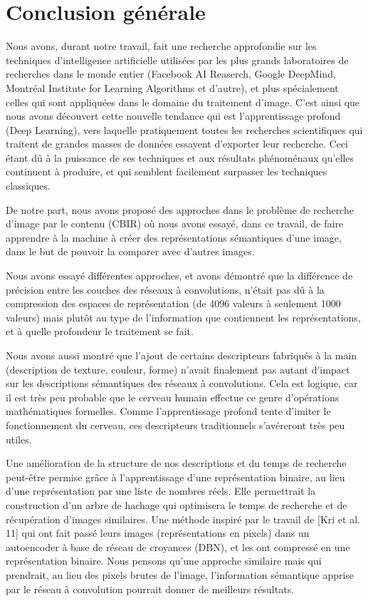 
\chapter*{Conclusion générale} %

Nous avons, durant notre travail, fait une recherche approfondie sur les techniques d'intelligence artificielle utilisées par les plus grands laboratoires de recherches dans le monde entier (Facebook AI Reaserch, Google DeepMind, Montréal Institute for Learning Algorithms et d'autre), et plus spécialement celles qui sont appliquées dans le domaine du traitement d'image. C'est ainsi que nous avons découvert cette nouvelle tendance qui est l'apprentissage profond (Deep Learning), vers laquelle pratiquement toutes les recherches scientifiques qui traitent de grandes masses de données essayent d'exporter leur recherche. Ceci étant dû à la puissance de ses techniques et aux résultats phénoménaux qu'elles continuent à produire, et qui semblent facilement surpasser les techniques classiques.

	De notre part, nous avons proposé des approches dans le problème de recherche d'image par le contenu (CBIR) où nous avons essayé, dans ce travail, de faire apprendre à la machine à créer des représentations sémantiques d'une image, dans le but de pouvoir la comparer avec d'autres images.

	Nous avons essayé différentes approches, et avons démontré que la différence de précision entre les couches des réseaux à convolutions, n’était pas dû à la compression des espaces de représentation (de 4096 valeurs à seulement 1000 valeurs) mais plutôt au type de l'information que contiennent les représentations, et à quelle profondeur le traitement se fait. 

Nous avons aussi montré que l'ajout de certains descripteurs fabriqués à la main (description de texture, couleur, forme) n'avait finalement pas autant d'impact sur les descriptions sémantiques des réseaux à convolutions. Cela est logique, car il est très peu probable que le cerveau humain effectue ce genre d’opérations mathématiques formelles. Comme l'apprentissage profond tente d'imiter le fonctionnement du cerveau, ces descripteurs traditionnels s’avéreront très peu utiles.

Une amélioration de la structure de nos descriptions et du temps de recherche peut-être permise grâce à l'apprentissage d'une représentation binaire, au lieu d'une représentation par une liste de nombres réels. Elle permettrait la construction d'un arbre de hachage qui optimisera le temps de recherche et de récupération d'images similaires. Une méthode inspiré par le travail de [Kri et al. 11] qui ont fait passé leurs images (représentations en pixels) dans un autoencoder à base de réseau de croyances (DBN), et les ont compressé en une représentation binaire. Nous pensons qu'une approche similaire mais qui prendrait, au lieu des pixels brutes de l'image, l'information sémantique apprise par le réseau à convolution pourrait donner de meilleurs résultats.

	

